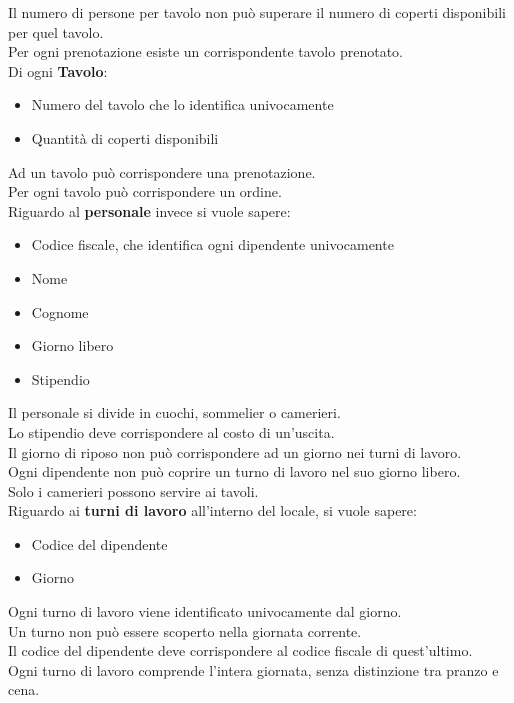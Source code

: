 Il numero di persone per tavolo non può superare il numero di coperti disponibili per quel tavolo. \\ 
Per ogni prenotazione esiste un corrispondente tavolo prenotato. \medskip \\ 
Di ogni \textbf{Tavolo}:
\begin{itemize}
    \item Numero del tavolo che lo identifica univocamente
    \item Quantità di coperti disponibili
\end{itemize}
Ad un tavolo può corrispondere una prenotazione. \\
Per ogni tavolo può corrispondere un ordine. \medskip \\
Riguardo al \textbf{personale} invece si vuole sapere:
\begin{itemize}
    \item Codice fiscale, che identifica ogni dipendente univocamente
    \item Nome 
    \item Cognome 
    \item Giorno libero
    \item Stipendio
\end{itemize}
Il personale si divide in cuochi, sommelier o camerieri.\\
Lo stipendio deve corrispondere al costo di un'uscita. \\
Il giorno di riposo non può corrispondere ad un giorno nei turni di lavoro. \\
Ogni dipendente non può coprire un turno di lavoro nel suo giorno libero. \\
Solo i camerieri possono servire ai tavoli. \medskip \\
Riguardo ai \textbf{turni di lavoro} all’interno del locale, si vuole sapere:
\begin{itemize}
    \item Codice del dipendente
    \item Giorno
\end{itemize}
Ogni turno di lavoro viene identificato univocamente dal giorno.\\
Un turno non può essere scoperto nella giornata corrente. \\
Il codice del dipendente deve corrispondere al codice fiscale di quest'ultimo. \\
Ogni turno di lavoro comprende l'intera giornata, senza distinzione tra pranzo e cena.
